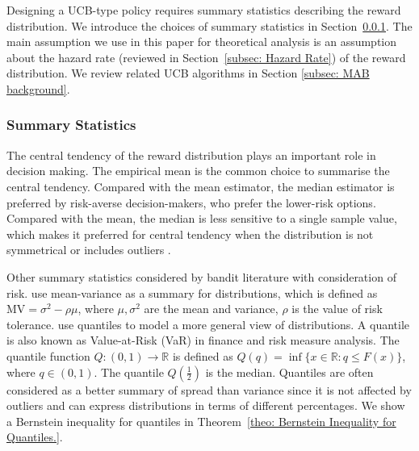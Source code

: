 Designing a UCB-type policy requires summary statistics describing the reward distribution.
We introduce the choices of summary statistics in
Section~\ref{subsec: Measure of Distribution}.
The main assumption we use in this paper for theoretical analysis is
an assumption about the hazard rate (reviewed in Section~\ref{subsec: Hazard Rate})
of the reward distribution.
We review related UCB algorithms in Section \ref{subsec: MAB background}.

\subsubsection{Summary Statistics}
\label{subsec: Measure of Distribution}

The central tendency of the reward distribution plays an important role in decision making.
The empirical mean is the common choice to summarise the central tendency.
Compared with the mean estimator, the median estimator is preferred by risk-averse decision-makers, who prefer the lower-risk options.
Compared with the mean, the median is less sensitive to a single sample value, which makes it preferred for central tendency when the distribution is not symmetrical or includes outliers \cite{Rousseeuw2011}.

Other summary statistics considered by bandit literature with consideration of risk.
\textcite{sani_risk-aversion_2012} use mean-variance as a summary for distributions, which is defined as
$\mathrm{MV}=\sigma^{2}-\rho \mu$,
where $\mu, \sigma^{2}$ are the mean and variance, $\rho$ is the value of risk tolerance.
\textcite{cassel_general_2018} use quantiles to model a more general view of distributions.
A quantile is also known as Value-at-Risk (VaR) in finance and risk measure analysis.
The quantile function $Q: (0,1) \rightarrow \mathbb{R}$ is defined as $Q(q)=\inf \{x \in \mathbb{R} : q \leq F(x)\}$,
where $q \in (0,1)$.
The quantile $Q(\frac{1}{2})$ is the median.
Quantiles are often considered as a better summary of spread than variance since it is not affected by outliers and can express distributions in terms of different percentages.
We show a Bernstein inequality for quantiles in Theorem~\ref{theo: Bernstein Inequality for Quantiles.}.


